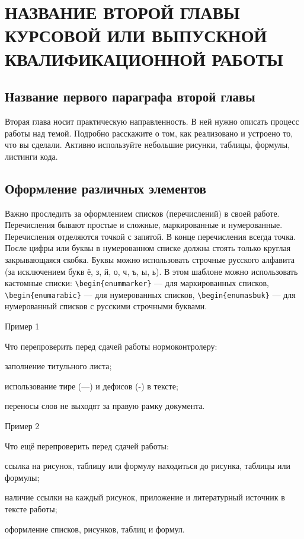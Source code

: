 \documentclass{report}
\begin{document}
\chapter{НАЗВАНИЕ ВТОРОЙ ГЛАВЫ КУРСОВОЙ ИЛИ ВЫПУСКНОЙ КВАЛИФИКАЦИОННОЙ РАБОТЫ}
\setcounter{section}{0}
\setcounter{subsection}{0}
\setcounter{equation}{0}
\section{Название первого параграфа второй главы}

Вторая глава носит практическую направленность. В ней нужно описать процесс работы над темой. Подробно расскажите о том, как реализовано и устроено то, что вы сделали. Активно используйте небольшие рисунки, таблицы, формулы, листинги кода. 

\section{Оформление различных элементов}

Важно проследить за оформлением списков (перечислений) в своей работе. Перечисления бывают простые и сложные, маркированные и нумерованные. Перечисления отделяются точкой с запятой. В конце перечисления всегда точка. После цифры или буквы в нумерованном списке должна стоять только круглая закрывающаяся скобка. Буквы можно использовать строчные русского алфавита (за исключением букв ё, з, й, о, ч, ъ, ы, ь).
В этом шаблоне можно использовать кастомные списки: \verb|\begin{enummarker}| --- для маркированных списков, \break \verb|\begin{enumarabic}| --- для нумерованных списков, \verb|\begin{enumasbuk}| --- для нумерованный списков с русскими строчными буквами.

Пример 1

Что перепроверить перед сдачей работы нормоконтролеру:
\begin{enummarker}
\item заполнение титульного листа;
\item использование тире (---) и дефисов (-) в тексте;
\item переносы слов не выходят за правую рамку документа. 
\end{enummarker}

Пример 2

Что ещё перепроверить перед сдачей работы:
\begin{enumarabic}
  \item ссылка на рисунок, таблицу или формулу находиться до рисунка, таблицы или формулы;
  \item наличие ссылки на каждый рисунок, приложение и литературный источник в тексте работы;
  \item оформление списков, рисунков, таблиц и формул.
\end{enumarabic}
\end{document}
